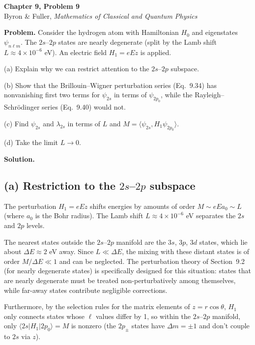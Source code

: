 \documentclass[12pt]{article}
\begin{document}
\begin{center}
{\Large\bfseries Chapter 9, Problem 9}\\[6pt]
Byron \& Fuller, \textit{Mathematics of Classical and Quantum Physics}
\end{center}

\bigskip

\textbf{Problem.} Consider the hydrogen atom with Hamiltonian $H_0$ and eigenstates $\psi_{n\ell m}$. The $2s$--$2p$ states are nearly degenerate (split by the Lamb shift $L \approx 4 \times 10^{-6}$ eV). An electric field $H_1 = eEz$ is applied.

(a) Explain why we can restrict attention to the $2s$--$2p$ subspace.

(b) Show that the Brillouin--Wigner perturbation series (Eq.~9.34) has nonvanishing first two terms for $\psi_{2s}$ in terms of $\psi_{2p_0}$, while the Rayleigh--Schr\"odinger series (Eq.~9.40) would not.

(c) Find $\psi_{2s}$ and $\lambda_{2s}$ in terms of $L$ and $M = \langle\psi_{2s}, H_1\psi_{2p_0}\rangle$.

(d) Take the limit $L \to 0$.

\bigskip
\textbf{Solution.}

\subsection*{(a) Restriction to the $2s$--$2p$ subspace}

The perturbation $H_1 = eEz$ shifts energies by amounts of order $M \sim eEa_0 \sim L$ (where $a_0$ is the Bohr radius). The Lamb shift $L \approx 4 \times 10^{-6}$ eV separates the $2s$ and $2p$ levels.

The nearest states outside the $2s$--$2p$ manifold are the $3s$, $3p$, $3d$ states, which lie about $\Delta E \approx 2$ eV away. Since $L \ll \Delta E$, the mixing with these distant states is of order $M/\Delta E \ll 1$ and can be neglected. The perturbation theory of Section~9.2 (for nearly degenerate states) is specifically designed for this situation: states that are nearly degenerate must be treated non-perturbatively among themselves, while far-away states contribute negligible corrections.

Furthermore, by the selection rules for the matrix elements of $z = r\cos\theta$, $H_1$ only connects states whose $\ell$ values differ by 1, so within the $2s$--$2p$ manifold, only $\langle 2s|H_1|2p_0\rangle = M$ is nonzero (the $2p_{\pm}$ states have $\Delta m = \pm 1$ and don't couple to $2s$ via $z$).
\end{document}

